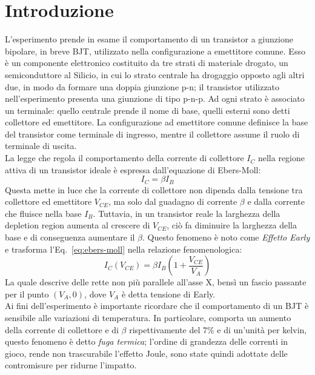 \documentclass[../main.tex]{subfiles}
\begin{document}
    \section{Introduzione} \label{sec:introduzione}

    L'esperimento prende in esame il comportamento di un transistor a giunzione bipolare,
    in breve BJT, utilizzato nella configurazione a emettitore comune.
    Esso è un componente elettronico costituito da tre strati di materiale drogato,
    un semiconduttore al Silicio, in cui lo strato centrale ha drogaggio opposto agli
    altri due, in modo da formare una doppia giunzione p-n; il transistor
    utilizzato nell'esperimento presenta una giunzione di tipo p-n-p.
    Ad ogni strato è associato un terminale: quello centrale prende il nome di base,
    quelli esterni sono detti collettore ed emettitore.
    La configurazione ad emettitore comune definisce la base del transistor come
    terminale di ingresso, mentre il collettore assume il ruolo di terminale di uscita.\\

    La legge che regola il comportamento della corrente di
    collettore $I_C$ nella regione attiva di un transistor ideale è
    espressa dall'equazione di Ebers-Moll:
    \begin{equation}
        I_C = \beta I_B
        \label{eq:ebers-moll}
    \end{equation}
    Questa mette in luce che la corrente di collettore non dipenda
    dalla tensione tra collettore ed emettitore $V_{CE}$, ma solo
    dal guadagno di corrente $\beta$ e dalla corrente che fluisce
    nella base $I_B$.
    Tuttavia, in un transistor reale la larghezza della depletion
    region aumenta al crescere di $V_{CE}$, ciò fa diminuire la
    larghezza della base e di conseguenza aumentare il $\beta$.
    Questo fenomeno è noto come \textit{Effetto Early} e trasforma
    l'Eq.~\eqref{eq:ebers-moll} nella relazione fenomenologica:
    \begin{equation}
        I_C(V_{CE}) = \beta I_B \left( 1 + \frac{V_{CE}}{V_A} \right)
        \label{eq:early}
    \end{equation}
    La quale descrive delle rette non più parallele all'asse X,
    bensì un fascio passante per il punto $(V_A, 0)$, dove $V_A$
    è detta tensione di Early.\\

    Ai fini dell'esperimento è importante ricordare che il
    comportamento di un BJT è sensibile alle variazioni di
    temperatura.
    In particolare, comporta un aumento della corrente di collettore
    e di $\beta$ rispettivamente del 7\% e di un'unità per kelvin,
    questo fenomeno è detto \textit{fuga termica}; l'ordine di
    grandezza delle correnti in gioco, rende non trascurabile
    l'effetto Joule, sono state quindi adottate delle contromisure
    per ridurne l'impatto.\\
\end{document}
